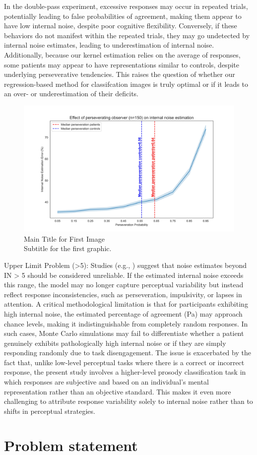 In the double-pass experiment, excessive responses may occur in repeated trials, potentially leading to false probabilities of agreement, making them appear to have low internal noise, despite poor cognitive flexibility. Conversely, if these behaviors do not manifest within the repeated trials, they may go undetected by internal noise estimates, leading to underestimation of internal noise. Additionally, because our kernel estimation relies on the average of responses, some patients may appear to have representations similar to controls, despite underlying perseverative tendencies. This raises the question of whether our regression-based method for classifcation images is truly optimal or if it leads to an over- or underestimation of their deficits.

\begin{figure}[ht!]
    \centering
    \includegraphics[width=15cm]{MainLayout/Images/chapter5/noise_perseverating_observer.jpg}
    \caption{Main Title for First Image \\ \small Subtitle for the first graphic.}
    \label{fig:noise_perseverating_observer}
\end{figure}



Upper Limit Problem (>5):
Studies (e.g., \cite{neri_how_2010}) suggest that noise estimates beyond IN > 5 should be considered unreliable.
If the estimated internal noise exceeds this range, the model may no longer capture perceptual variability but instead reflect response inconsistencies, such as perseveration, impulsivity, or lapses in attention.
A critical methodological limitation is that for participants exhibiting high internal noise, the estimated percentage of agreement (Pa) may approach chance levels, making it indistinguishable from completely random responses. In such cases, Monte Carlo simulations may fail to differentiate whether a patient genuinely exhibits pathologically high internal noise or if they are simply responding randomly due to task disengagement. The issue is exacerbated by the fact that, unlike low-level perceptual tasks where there is a correct or incorrect response, the present study involves a higher-level prosody classification task in which responses are subjective and based on an individual’s mental representation rather than an objective standard. This makes it even more challenging to attribute response variability solely to internal noise rather than to shifts in perceptual strategies.


\section {Problem statement} 
